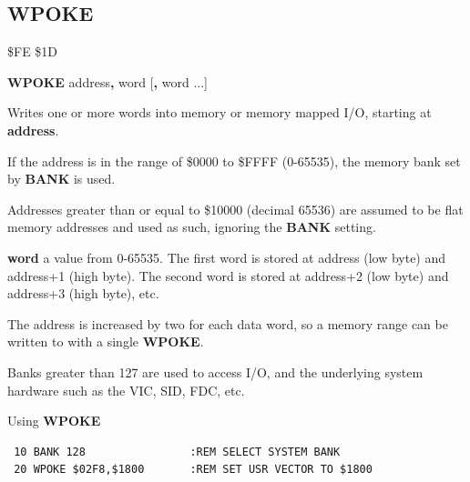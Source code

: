 \subsection{WPOKE}
\begin{description}[leftmargin=2cm,style=nextline]
\item [Token:] \$FE \$1D
\item [Format:] {\bf WPOKE} address{\bf,} word [{\bf,} word ...]
\item [Usage:]  Writes one or more words into memory
                or memory mapped I/O, starting at {\bf address}.

                If the address is in the range of \$0000 to \$FFFF (0-65535), the
                memory bank set by {\bf BANK} is used.

                Addresses greater than or equal to \$10000 (decimal 65536) are assumed to be flat memory
                addresses and used as such, ignoring the {\bf BANK} setting.

                {\bf word} a value from 0-65535.
                The first word is stored at address (low byte)
                and address+1 (high byte). The second word is stored at
                address+2 (low byte) and address+3 (high byte), etc.

\item [Remarks:] The address is increased by two for each data word,
                 so a memory range can be written to with a single {\bf WPOKE}.

                Banks greater than 127 are used to access I/O, and the underlying system hardware such as the
                VIC, SID, FDC, etc.
\item [Example:] Using {\bf WPOKE}

\begin{tcolorbox}[colback=black,coltext=white]
\verbatimfont{\codefont}
\begin{verbatim}
 10 BANK 128                :REM SELECT SYSTEM BANK
 20 WPOKE $02F8,$1800       :REM SET USR VECTOR TO $1800
\end{verbatim}
\end{tcolorbox}
\end{description}


\newpage

